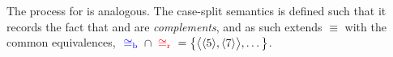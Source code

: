 \begin{example}
\medskip
The process for \cblue is analogous.
The case-split semantics is defined such that it records the fact
that \cblue and \cred are \emph{complements},
and as such extends $\equiv$ with the common equivalences,
${~\color{blue}\cong_{\mathrm{b}}\,\,}\cap{~\color{red}\cong_{\mathrm{r}}\,\,} = \big\{\big\langle\langle 5\rangle,\langle 7\rangle\big\rangle, \ldots\big\}$.

\end{example}

